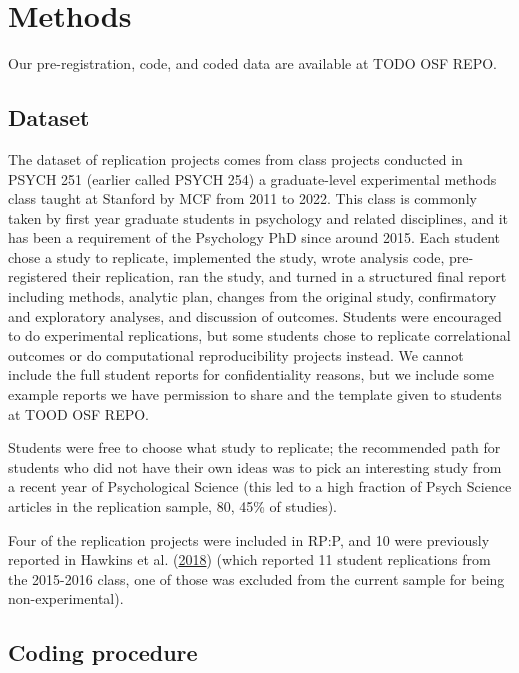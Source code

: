 \documentclass[
  english,
  a4paper,
]{article}
\begin{document}
\hypertarget{methods}{%
\section{Methods}\label{methods}}

Our pre-registration, code, and coded data are available at TODO OSF REPO.

\hypertarget{dataset}{%
\subsection{Dataset}\label{dataset}}

The dataset of replication projects comes from class projects conducted in PSYCH 251 (earlier called PSYCH 254) a graduate-level experimental methods class taught at Stanford by MCF from 2011 to 2022. This class is commonly taken by first year graduate students in psychology and related disciplines, and it has been a requirement of the Psychology PhD since around 2015. Each student chose a study to replicate, implemented the study, wrote analysis code, pre-registered their replication, ran the study, and turned in a structured final report including methods, analytic plan, changes from the original study, confirmatory and exploratory analyses, and discussion of outcomes. Students were encouraged to do experimental replications, but some students chose to replicate correlational outcomes or do computational reproducibility projects instead. We cannot include the full student reports for confidentiality reasons, but we include some example reports we have permission to share and the template given to students at TOOD OSF REPO.

Students were free to choose what study to replicate; the recommended path for students who did not have their own ideas was to pick an interesting study from a recent year of Psychological Science (this led to a high fraction of Psych Science articles in the replication sample, 80, 45\% of studies).

Four of the replication projects were included in RP:P, and 10 were previously reported in Hawkins et al. (\protect\hyperlink{ref-hawkins2018}{2018}) (which reported 11 student replications from the 2015-2016 class, one of those was excluded from the current sample for being non-experimental).

\hypertarget{coding-procedure}{%
\subsection{Coding procedure}\label{coding-procedure}}
\end{document}
